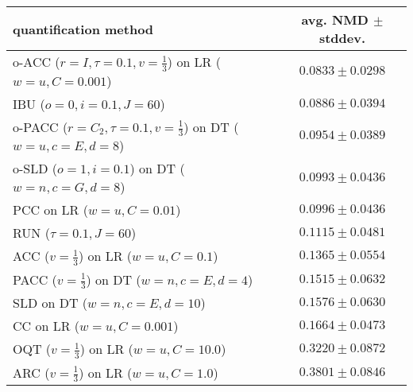 \begin{tabular}{lc}
  \toprule
  quantification method & avg. NMD $\pm$ stddev. \\
  \midrule
  o-ACC ($r=I, \tau=0.1, v=\frac{1}{3}$) on LR ($w=u, C=0.001$) & $\mathbf{0.0833 \pm 0.0298}$ \\
  IBU ($o=0, i=0.1, J=60$) & $0.0886 \pm 0.0394$ \\
  o-PACC ($r=C_2, \tau=0.1, v=\frac{1}{3}$) on DT ($w=u, c=E, d=8$) & $0.0954 \pm 0.0389$ \\
  o-SLD ($o=1, i=0.1$) on DT ($w=n, c=G, d=8$) & $0.0993 \pm 0.0436$ \\
  PCC on LR ($w=u, C=0.01$) & $0.0996 \pm 0.0436$ \\
  RUN ($\tau=0.1, J=60$) & $0.1115 \pm 0.0481$ \\
  ACC ($v=\frac{1}{3}$) on LR ($w=u, C=0.1$) & $0.1365 \pm 0.0554$ \\
  PACC ($v=\frac{1}{3}$) on DT ($w=n, c=E, d=4$) & $0.1515 \pm 0.0632$ \\
  SLD on DT ($w=n, c=E, d=10$) & $0.1576 \pm 0.0630$ \\
  CC on LR ($w=u, C=0.001$) & $0.1664 \pm 0.0473$ \\
  OQT ($v=\frac{1}{3}$) on LR ($w=u, C=10.0$) & $0.3220 \pm 0.0872$ \\
  ARC ($v=\frac{1}{3}$) on LR ($w=u, C=1.0$) & $0.3801 \pm 0.0846$ \\
  \bottomrule
\end{tabular}

